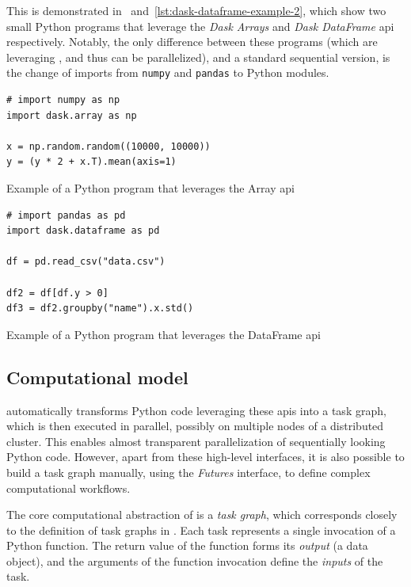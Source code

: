 This is demonstrated in~ and~\ref{lst:dask-dataframe-example-2}, which show two
small Python programs that leverage the \emph{Dask Arrays} and \emph{Dask DataFrame}
\gls{api} respectively. Notably, the only difference between these programs
(which are leveraging \dask{}, and thus can be parallelized), and a standard
sequential version, is the change of imports from \texttt{numpy} and
\texttt{pandas} to \dask{} Python modules.

\begin{listing}[h]
	\begin{verbatim}
# import numpy as np
import dask.array as np

x = np.random.random((10000, 10000))
y = (y * 2 + x.T).mean(axis=1)
	\end{verbatim}
	\caption{Example of a Python program that leverages the \dask{} Array
	\gls{api}}
	\label{lst:dask-array-example}
\end{listing}

\begin{listing}[h]
	\begin{verbatim}
# import pandas as pd
import dask.dataframe as pd

df = pd.read_csv("data.csv")

df2 = df[df.y > 0]
df3 = df2.groupby("name").x.std()
	\end{verbatim}
	\caption{Example of a Python program that leverages the \dask{} DataFrame
	\gls{api}}
	\label{lst:dask-dataframe-example-2}
\end{listing}

\subsection*{Computational model}
\dask{} automatically transforms Python code leveraging these
\glspl{api} into a task graph, which is then executed in parallel, possibly on
multiple nodes of a distributed cluster. This enables almost transparent parallelization of
sequentially looking Python code. However, apart from these high-level interfaces, it is also
possible to build a task graph manually, using the \emph{Futures} interface, to define
complex computational workflows.

The core computational abstraction of \dask{} is a \emph{task graph},
which corresponds closely to the definition of task graphs in . Each
task represents a single invocation of a Python function. The return value of the function forms
its \emph{output} (a data object), and the arguments of the function invocation define the
\emph{inputs} of the task.

